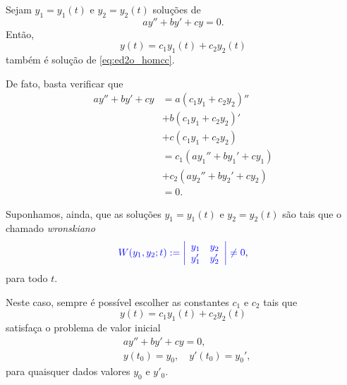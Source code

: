 Sejam $y_1 = y_1(t)$ e $y_2 = y_2(t)$ soluções de
\begin{equation}\label{eq:ed2o_homcc}
  ay'' + by' + cy = 0.
\end{equation}
Então,
\begin{equation}
  y(t) = c_1y_1(t) + c_2y_2(t)
\end{equation}
também é solução de \eqref{eq:ed2o_homcc}.

De fato, basta verificar que
\begin{align}
  ay'' + by' + cy &= a(c_1y_1+c_2y_2)'' \\
                  &+ b(c_1y_1 + c_2y_2)' \\
                  &+ c(c_1y_1 + c_2y_2) \\
                  &= c_1(ay_1'' + by_1' + cy_1) \\
                  &+ c_2(ay_2'' + by_2' + cy_2) \\
                  &= 0.
\end{align}

Suponhamos, ainda, que as soluções $y_1 = y_1(t)$ e $y_2 = y_2(t)$ são tais que o chamado \emph{wronskiano}
\begin{equation}
  {\color{blue}W(y_1,y_2;t) := \left|
    \begin{array}{cc}
      y_1 & y_2 \\
      y_1' & y_2'
    \end{array}
\right| \neq 0},
\end{equation}
para todo $t$.

Neste caso, sempre é possível escolher as constantes $c_1$ e $c_2$ tais que
\begin{equation}\label{eq:od2o_homcc_sg}
  y(t) = c_1y_1(t) + c_2y_2(t)
\end{equation}
satisfaça o problema de valor inicial
\begin{align}
  &ay'' + by' + cy = 0,\\
  &y(t_0) = y_0,\quad y'(t_0) = y_0',
\end{align}
para quaisquer dados valores $y_0$ e $y'_0$.


